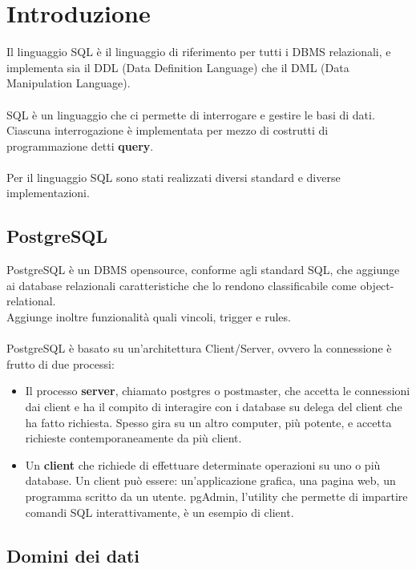 \chapter{Introduzione}

Il linguaggio SQL è il linguaggio di riferimento per tutti i DBMS relazionali, e implementa sia il DDL (Data Definition Language) che il DML (Data Manipulation Language).\\\\
SQL è un linguaggio che ci permette di interrogare e gestire le basi di dati.\\
Ciascuna interrogazione è implementata per mezzo di costrutti di programmazione detti \textbf{query}.\\\\
Per il linguaggio SQL sono stati realizzati diversi standard e diverse implementazioni.

\section{PostgreSQL}
PostgreSQL è un DBMS opensource, conforme agli standard SQL, che aggiunge ai database relazionali caratteristiche che lo rendono classificabile come object-relational.\\
Aggiunge inoltre funzionalità quali vincoli, trigger e rules.\\\\
PostgreSQL è basato su un'architettura Client/Server, ovvero la connessione è frutto di due processi:
    \begin{itemize}
        \item{Il processo \textbf{server}, chiamato postgres o postmaster, che accetta le connessioni dai client e ha il compito di interagire con i database su delega del client che ha fatto richiesta. Spesso gira su un altro computer, più potente, e accetta richieste contemporaneamente da più client.}
        \item{Un \textbf{client} che richiede di effettuare determinate operazioni su uno o più database. Un client può essere: un’applicazione grafica, una pagina web, un programma scritto da un utente. pgAdmin, l'utility che permette di impartire comandi SQL interattivamente, è un esempio di client.}
    \end{itemize}

\section{Domini dei dati}
